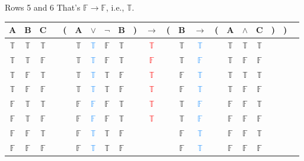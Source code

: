 \documentclass[
  ignorenonframetext,
]{beamer}
\renewcommand{\,}{\text{, }}
\def\True{\mathbb{T}}
\def\False{\mathbb{F}}
\begin{document}
\begin{frame}{Rows 5 and 6}
\protect\hypertarget{rows-5-and-6}{}
That's \(\False \rightarrow \False\), i.e., \(\True\).

\begin{center}

\begin{tabular}{@{ }c@{ }@{ }c@{ }@{ }c | c@{ }@{}c@{}@{ }c@{ }@{ }c@{ }@{ }c@{ }@{ }c@{ }@{}c@{}@{ }c@{ }@{}c@{}@{ }c@{ }@{ }c@{ }@{}c@{}@{ }c@{ }@{ }c@{ }@{ }c@{ }@{}c@{}@{}c@{}@{ }c}
A & B & C &  & ( & A & $\vee$ & $\neg$ & B & ) & $\rightarrow$ & ( & B & $\rightarrow$ & ( & A & $\wedge$ & C & ) & ) & \\
\hline 
 $\True$ & $\True$ & $\True$ &  &  & $\True$ & \textcolor{dodgerblue}{$\True$} & $\False$ & $\True$ &  &\textcolor{red}{$\True$}&  & $\True$ & \textcolor{dodgerblue}{$\True$} &  & $\True$ & $\True$ & $\True$ &  &  & \\
 $\True$ & $\True$ & $\False$ &  &  & $\True$ & \textcolor{dodgerblue}{$\True$} & $\False$ & $\True$ &  &\textcolor{red}{$\False$}&  & $\True$ & \textcolor{dodgerblue}{$\False$} &  & $\True$ & $\False$ & $\False$ &  &  & \\
 $\True$ & $\False$ & $\True$ &  &  & $\True$ & \textcolor{dodgerblue}{$\True$} & $\True$ & $\False$ &  &\textcolor{red}{$\True$}&  & $\False$ & \textcolor{dodgerblue}{$\True$} &  & $\True$ & $\True$ & $\True$ &  &  & \\
 $\True$ & $\False$ & $\False$ &  &  & $\True$ & \textcolor{dodgerblue}{$\True$} & $\True$ & $\False$ &  &\textcolor{red}{$\True$}&  & $\False$ & \textcolor{dodgerblue}{$\True$} &  & $\True$ & $\False$ & $\False$ &  &  & \\
 $\False$ & $\True$ & $\True$ &  &  & $\False$ & \textcolor{dodgerblue}{$\False$} & $\False$ & $\True$ &  &\textcolor{red}{$\True$}&  & $\True$ & \textcolor{dodgerblue}{$\False$} &  & $\False$ & $\False$ & $\True$ &  &  & \\
 $\False$ & $\True$ & $\False$ &  &  & $\False$ & \textcolor{dodgerblue}{$\False$} & $\False$ & $\True$ &  &\textcolor{red}{$\True$}&  & $\True$ & \textcolor{dodgerblue}{$\False$} &  & $\False$ & $\False$ & $\False$ &  &  & \\
 $\False$ & $\False$ & $\True$ &  &  & $\False$ & \textcolor{dodgerblue}{$\True$} & $\True$ & $\False$ &  &&  & $\False$ & \textcolor{dodgerblue}{$\True$} &  & $\False$ & $\False$ & $\True$ &  &  & \\
 $\False$ & $\False$ & $\False$ &  &  & $\False$ & \textcolor{dodgerblue}{$\True$} & $\True$ & $\False$ &  &&  & $\False$ & \textcolor{dodgerblue}{$\True$} &  & $\False$ & $\False$ & $\False$ &  &  & \\
\end{tabular}

\end{center}
\end{frame}
\end{document}
